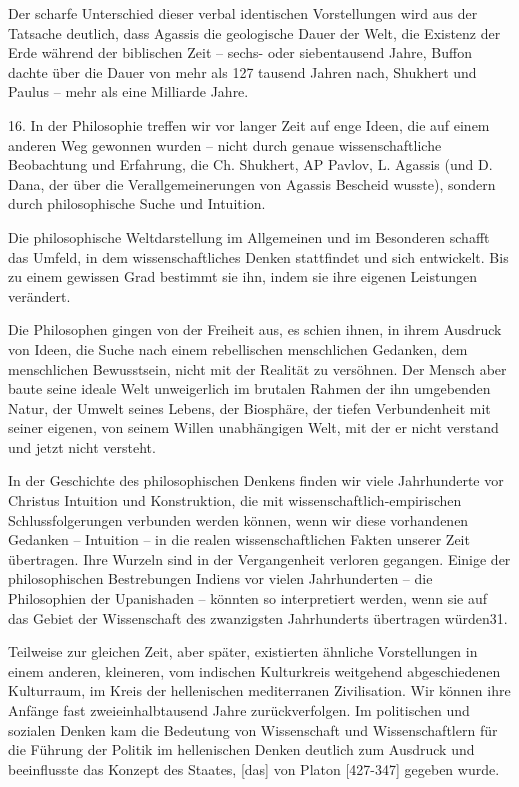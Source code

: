 \documentclass[11pt,a4paper]{book}
\begin{document}
Der scharfe Unterschied dieser verbal identischen Vorstellungen wird aus der Tatsache deutlich, dass Agassis die geologische Dauer der Welt, die Existenz der Erde während der biblischen Zeit -- sechs- oder siebentausend Jahre, Buffon dachte über die Dauer von mehr als 127 tausend Jahren nach, Shukhert und Paulus -- mehr als eine Milliarde Jahre. 

16. In der Philosophie treffen wir vor langer Zeit auf enge Ideen, die auf einem anderen Weg gewonnen wurden -- nicht durch genaue wissenschaftliche Beobachtung und Erfahrung, die Ch. Shukhert, AP Pavlov, L. Agassis (und D. Dana, der über die Verallgemeinerungen von Agassis Bescheid wusste), sondern durch philosophische Suche und Intuition. 

Die philosophische Weltdarstellung im Allgemeinen und im Besonderen schafft das Umfeld, in dem wissenschaftliches Denken stattfindet und sich entwickelt. Bis zu einem gewissen Grad bestimmt sie ihn, indem sie ihre eigenen Leistungen verändert. 

Die Philosophen gingen von der Freiheit aus, es schien ihnen, in ihrem Ausdruck von Ideen, die Suche nach einem rebellischen menschlichen Gedanken, dem menschlichen Bewusstsein, nicht mit der Realität zu versöhnen. Der Mensch aber baute seine ideale Welt unweigerlich im brutalen Rahmen der ihn umgebenden Natur, der Umwelt seines Lebens, der Biosphäre, der tiefen Verbundenheit mit seiner eigenen, von seinem Willen unabhängigen Welt, mit der er nicht verstand und jetzt nicht versteht. 

In der Geschichte des philosophischen Denkens finden wir viele Jahrhunderte vor Christus Intuition und Konstruktion, die mit wissenschaftlich-empirischen Schlussfolgerungen verbunden werden können, wenn wir diese vorhandenen Gedanken -- Intuition -- in die realen wissenschaftlichen Fakten unserer Zeit übertragen. Ihre Wurzeln sind in der Vergangenheit verloren gegangen. Einige der philosophischen Bestrebungen Indiens vor vielen Jahrhunderten -- die Philosophien der Upanishaden -- könnten so interpretiert werden, wenn sie auf das Gebiet der Wissenschaft des zwanzigsten Jahrhunderts übertragen würden31. 

Teilweise zur gleichen Zeit, aber später, existierten ähnliche Vorstellungen in einem anderen, kleineren, vom indischen Kulturkreis weitgehend abgeschiedenen Kulturraum, im Kreis der hellenischen mediterranen Zivilisation. Wir können ihre Anfänge fast zweieinhalbtausend Jahre zurückverfolgen. Im politischen und sozialen Denken kam die Bedeutung von Wissenschaft und Wissenschaftlern für die Führung der Politik im hellenischen Denken deutlich zum Ausdruck und beeinflusste das Konzept des Staates, [das] von Platon [427-347] gegeben wurde. 
\end{document}
